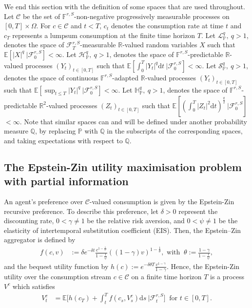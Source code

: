 \documentclass[12,reqno]{amsart}
\numberwithin{equation}{section}
\begin{document}
We end this section with the definition of some spaces that are used throughout. Let $\mathcal{C}$ be the set of $\mathbb{F}^{r,S}$-non-negative progressively measurable processes on $[0,T]\times\Omega$. For $c\in\mathcal{C}$ and $t<T$, $c_{t}$ denotes the consumption rate at time $t$ and $c_{T}$ represents a lumpsum consumption at the finite time horizon $T$. Let $\mathcal{L}_{\mathbb{P}}^{q},~{q>1}$, denotes the space of $\mathcal{F}_{T}^{r,S}$-measurable $\mathbb{R}$-valued random variables $X$ such that $\mathbb{E}[|X|^{q}~\big|\mathcal{F}_{0}^{r,S}]<\infty$. Let $\mathcal{H}_{\mathbb{P}}^{q},~{q>1}$, denotes the space of $\mathbb{F}^{r,S}$-predictable $\mathbb{R}$-valued processes $(Y_{t})_{t\in[0,T]}$ such that $\mathbb{E}[\int_{0}^{T}|Y_{t}|^{q}\mathrm{d}t~\big|\mathcal{F}_{0}^{r,S}]<\infty$. {Let $\mathcal{S}_{\mathbb{P}}^{q},~q>1$, denotes the space of continuous $\mathbb{F}^{r,S}$-adapted $\mathbb{R}$-valued processes $(Y_{t})_{t\in[0,T]}$ such that $\mathbb{E}[\sup_{t\le T}|Y_{t}|^{q}~\big|\mathcal{F}_{0}^{r,S}]<\infty$.} Let $\mathbb{H}_{\mathbb{P}}^{q},~{q>1}$, denotes the space of $\mathbb{F}^{r,S}$-predictable $\mathbb{R}^{2}$-valued processes $(Z_{t})_{t\in[0,T]}$ such that $\mathbb{E}[(\int_{0}^{T}|Z_{t}|^{2}\mathrm{d}t)^{\frac{q}{2}}~\big|\mathcal{F}_{0}^{r,S}]$ $<\infty$. Note that similar spaces can and will be defined under another probability measure $\mathbb{Q}$, by replacing $\mathbb{P}$ with $\mathbb{Q}$ in the subscripts of the corresponding spaces, and taking expectations with respect to $\mathbb{Q}$.

\subsection{The Epstein-Zin utility maximisation problem with partial information}\label{The recursive utility maximisation problem}
An agent's preference over $\mathcal{C}$-valued consumption is given by the Epstein-Zin recursive preference. To describe this preference, let $\delta>0$ represent the discounting rate, $0<\gamma\neq1$ be the relative risk aversion, and $0<\psi\neq1$ be the elasticity of intertemporal substitution coefficient (EIS). Then, the Epstein–Zin aggregator is defined by
\begin{align}\label{Epstein-Zin generator}
	f(c,v)&:=\delta e^{-\delta t} \frac{c^{1-\frac{1}{\psi}}}{1-\frac{1}{\psi}}((1-\gamma)v)^{1-\frac{1}{\theta}},\text{ with }~\theta:=\frac{1-\gamma}{1-\frac{1}{\psi}},
\end{align}
and the bequest utility function by $h(c):=e^{-\delta\theta T}\frac{c^{1-\gamma}}{1-\gamma}$. Hence, the Epstein-Zin utility over the consumption stream $c\in\mathcal{C}$ on a finite time horizon $T$ is a process $V^{c}$ which satisfies
\begin{align}\label{Epstein-Zin utility}
	V_{t}^{c}&=\mathbb{E}\Big[h(c_{T})+\int_{t}^{T}f(c_{s},V_{s}^{c})\mathrm{d}s~\big|\mathcal{F}_{t}^{r,S}\Big]~\text{ for }t\in[0,T].
\end{align}
\end{document}
